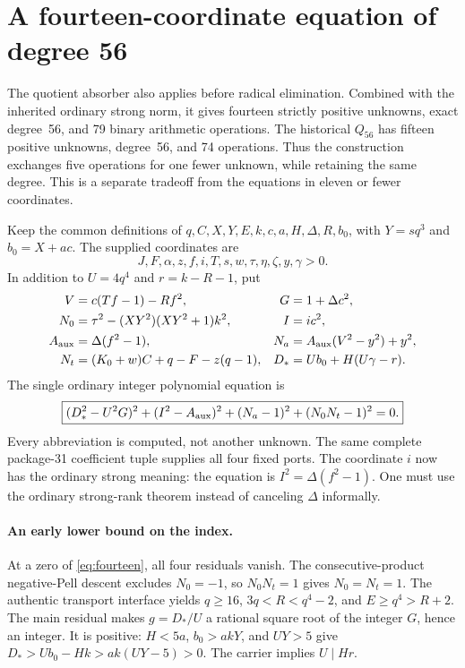 \section{A fourteen-coordinate equation of degree 56}
\label{sec:fourteen}

The quotient absorber also applies before radical elimination. Combined
with the inherited ordinary strong norm, it gives fourteen strictly
positive unknowns, exact degree~56, and 79 binary arithmetic operations.
The historical $Q_{56}$ has fifteen positive unknowns, degree~56, and
74 operations. Thus the construction exchanges five operations for one
fewer unknown, while retaining the same degree. This is a separate
tradeoff from the equations in eleven or fewer coordinates.

Keep the common definitions of $q,C,X,Y,E,k,c,a,H,\Delta,R,b_0$,
with $Y=sq^3$ and $b_0=X+ac$. The supplied coordinates are
\[
 J,F,\alpha,z,f,i,T,s,w,\tau,\eta,\zeta,y,\gamma>0.
\]
In addition to $U=4q^4$ and $r=k-R-1$, put
\begin{align*}
 V&=c(Tf-1)-Rf^2, & G&=1+\Delta c^2,\\
 N_0&=\tau^2-(XY^2)(XY^2+1)k^2,
 &I&=ic^2,\\
 A_{\rm aux}&=\Delta(f^2-1),
 &N_a&=A_{\rm aux}(V^2-y^2)+y^2,\\
 N_t&=(K_0+w)C+q-F-z(q-1),
 &D_*&=Ub_0+H(U\gamma-r).
\end{align*}
The single ordinary integer polynomial equation is
\begin{equation}
 \boxed{(D_*^2-U^2G)^2+(I^2-A_{\rm aux})^2+(N_a-1)^2+(N_0N_t-1)^2=0.}
 \label{eq:fourteen}
\end{equation}
Every abbreviation is computed, not another unknown. The same complete
package-31 coefficient tuple supplies all four fixed ports. The coordinate
$i$ now has the ordinary strong meaning: the equation is
$I^2=\Delta(f^2-1)$. One must use the ordinary strong-rank theorem
instead of canceling $\Delta$ informally.

\paragraph{An early lower bound on the index.}
At a zero of \eqref{eq:fourteen}, all four residuals vanish. The
consecutive-product negative-Pell descent excludes $N_0=-1$, so
$N_0N_t=1$ gives $N_0=N_t=1$. The authentic transport interface yields
$q\ge16$, $3q<R<q^4-2$, and $E\ge q^4>R+2$.
The main residual makes $g=D_*/U$ a rational square root of the
integer $G$, hence an integer. It is positive: $H<5a$, $b_0>akY$,
and $UY>5$ give $D_*>Ub_0-Hk>ak(UY-5)>0$.
The carrier implies $U\mid Hr$.

